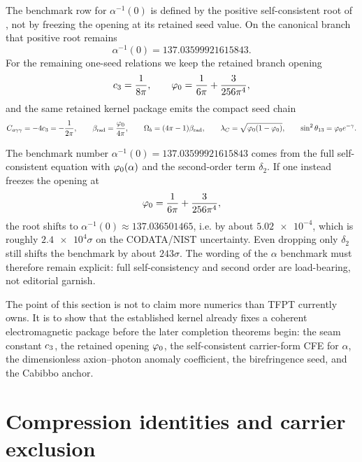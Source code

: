 The benchmark row for $\alpha^{-1}(0)$ is defined by the positive self-consistent root of , not by freezing the opening at its retained seed value. On the canonical branch that positive root remains
\[
\alpha^{-1}(0)=\num{137.03599921615843}.
\]
For the remaining one-seed relations we keep the retained branch opening
\begin{equation}
\label{eq:hard-kernel-values}
c_3=\frac{1}{8\pi},
\qquad
\varphi_0=\frac{1}{6\pi}+\frac{3}{256\pi^4},
\end{equation}
and the same retained kernel package emits the compact seed chain
\begin{equation}
\label{eq:kernel-benchmark-formulas}
C_{a\gamma\gamma}=-4c_3=-\frac{1}{2\pi},
\qquad
\beta_{\mathrm{rad}}=\frac{\varphi_0}{4\pi},
\qquad
\Omega_b=(4\pi-1)\beta_{\mathrm{rad}},
\qquad
\lambda_C=\sqrt{\varphi_0(1-\varphi_0)},
\qquad
\sin^2\theta_{13}=\varphi_0 e^{-\gamma}.
\end{equation}
\begin{remark}
The benchmark number $\alpha^{-1}(0)=\num{137.03599921615843}$ comes from the full self-consistent equation with $\varphi_0(\alpha)$ and the second-order term $\delta_2$. If one instead freezes the opening at
\[
\varphi_0=\frac{1}{6\pi}+\frac{3}{256\pi^4},
\]
the root shifts to $\alpha^{-1}(0)\approx \num{137.036501465}$, i.e. by about $\num{5.02e-4}$, which is roughly $\num{2.4e4}\sigma$ on the CODATA/NIST uncertainty. Even dropping only $\delta_2$ still shifts the benchmark by about $243\sigma$. The wording of the $\alpha$ benchmark must therefore remain explicit: full self-consistency and second order are load-bearing, not editorial garnish.
\end{remark}
\begin{tcolorbox}[colback=blue!3, colframe=blue!50!black, breakable,
    title={\textbf{Kernel-output package}}, fonttitle=\bfseries]
The point of this section is not to claim more numerics than TFPT currently owns. It is to show that the established kernel already fixes a coherent electromagnetic package before the later completion theorems begin: the seam constant $c_3$, the retained opening $\varphi_0$, the self-consistent carrier-form CFE for $\alpha$, the dimensionless axion--photon anomaly coefficient, the birefringence seed, and the Cabibbo anchor.
\end{tcolorbox}

\section{Compression identities and carrier exclusion}

